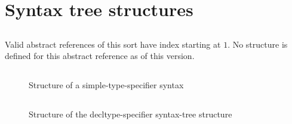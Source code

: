 \section{Syntax tree structures}
\label{sec:ifc:SyntaxSort-structures}

\subsection{}
\label{sec:ifc:SyntaxSort:VendorExtension}

Valid abstract references of this sort have index starting at $1$.
No structure is defined for this abstract reference as of this version.


\subsection{}
\label{sec:ifc:SyntaxSort:SimpleTypeSpecifier}

\begin{figure}[H]
	\centering
	\caption{Structure of a simple-type-specifier syntax}
	\label{fig:ifc:SyntaxSort:SimpleTypeSpecifier}
\end{figure}


\subsection{}
\label{sec:ifc:SyntaxSort:DecltypeSpecifier}

\begin{figure}[H]
	\centering
	\caption{Structure of the decltype-specifier syntax-tree structure}
	\label{fig:ifc:SyntaxSort:DecltypeSpecifier}
\end{figure}

